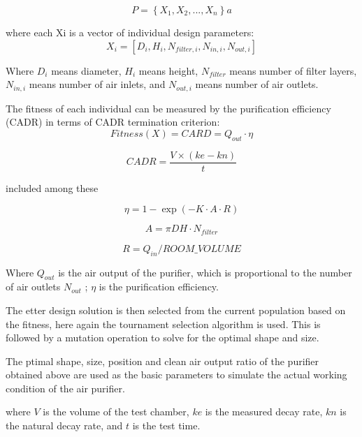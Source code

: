 \documentclass{apmcmthesis}
\begin{document}
\begin{equation}
P = \left\{ {{X_1},{X_2},...,{X_n}} \right\}a
\end{equation}

where each Xi is a vector of individual design parameters:
\begin{equation}
{X_i} = [{D_i},{H_i},{N_{filter,i}},{N_{in,i}},{N_{out,i}}]
\end{equation}

Where 
${D_i}$ means diameter,
${H_i}$ means height,
${N_{filter}}$ means number of filter layers,
${N_{in,i}}$ means number of air inlets, and
${N_{out,i}}$ means number of air outlets.

The fitness of each individual can be measured by the purification efficiency (CADR) in terms of CADR termination criterion:
\begin{equation}
Fitness(X) = CARD = {Q_{out}} \cdot \eta 
\end{equation}

\begin{equation}
CADR = \frac{{V \times \left( {ke - kn} \right)}}{t}
\end{equation}

included among these

\begin{equation}
\eta  = 1 - \exp ( - K \cdot A \cdot R)
\end{equation}

\begin{equation}
A = \pi DH \cdot {N_{filter}}
\end{equation}

\begin{equation}
R = {Q_{in}}/ROOM\_VOLUME
\end{equation}

Where ${Q_{out}}$ is the air output of the purifier, which is proportional to the number of air outlets
${N_{out}}$ ; 
$\eta $ is the purification efficiency.

The etter design solution is then selected from the current population based on the fitness, here again the tournament selection algorithm is used. This is followed by a mutation operation to solve for the optimal shape and size.

The ptimal shape, size, position and clean air output ratio of the purifier obtained above are used as the basic parameters to simulate the actual working condition of the air purifier.

where
$V$ is the volume of the test chamber, 
$ke$ is the measured decay rate,
$kn$  is the natural decay rate, and 
$t$ is the test time.
\end{document}
